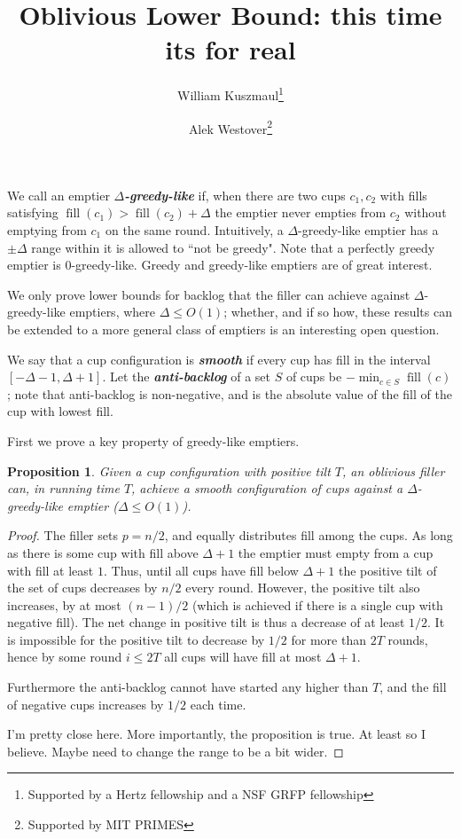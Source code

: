 \documentclass[twocolumn]{article}[10pt]
\title{Oblivious Lower Bound: this time its for real}
\date{\vspace{-5ex}}
\author[1]{\small William Kuszmaul\thanks{Supported by a Hertz fellowship and a NSF GRFP fellowship}}
\author[2]{\small Alek Westover\thanks{Supported by MIT PRIMES}}
\affil[ ]{\footnotesize MIT\textsuperscript{1}, MIT PRIMES\textsuperscript{2}}
\affil[ ]{\textit{kuszmaul@mit.edu, alek.westover@gmail.com}}
\newcommand{\defn}[1]{{\textit{\textbf{\boldmath #1}}}\xspace}
\DeclareMathOperator{\fil}{\text{fill}}
\newtheorem{proposition}{Proposition}
\begin{document}
\maketitle

We call an emptier $\Delta$\defn{-greedy-like} if, when there are two cups $c_1, c_2$ with
fills satisfying $\fil(c_1) > \fil(c_2) + \Delta$ the emptier never
empties from $c_2$ without emptying from $c_1$ on the same round. 
Intuitively, a $\Delta$-greedy-like emptier has a $\pm \Delta$ range within it is
allowed to ``not be greedy". Note that a perfectly greedy emptier is $0$-greedy-like.
Greedy and greedy-like emptiers are of great interest.

We only prove lower bounds for backlog that the filler can achieve against
$\Delta$-greedy-like emptiers, where $\Delta \le O(1)$; whether, and if so how,
these results can be extended to a more general class of emptiers is an
interesting open question. 

We say that a cup configuration is \defn{smooth} if every cup has fill in the
interval $[-\Delta -1, \Delta +1]$. 
Let the \defn{anti-backlog} of a set $S$ of cups be $-\min_{c\in S} \fil(c)$;
note that anti-backlog is non-negative, and is the absolute value of the fill
of the cup with lowest fill. 

First we prove a key property of greedy-like emptiers.
\begin{proposition}
  Given a cup configuration with positive tilt $T$, an oblivious filler can, in
  running time $T$, achieve a smooth configuration of cups against a
  $\Delta$-greedy-like emptier ($\Delta \le O(1)$).
\end{proposition}
\begin{proof}
  The filler sets $p=n/2$, and equally distributes fill among the cups.
  As long as there is some cup with fill above $\Delta+1$ the emptier must
  empty from a cup with fill at least $1$. Thus, until all cups have fill below
  $\Delta+1$ the positive tilt of the set of cups decreases by $n/2$ every round.
  However, the positive tilt also increases, by at most $(n-1)/2$ (which is
  achieved if there is a single cup with negative fill). The net change in
  positive tilt is thus a decrease of at least $1/2$.
  It is impossible for the positive tilt to decrease by $1/2$ for more than
  $2T$ rounds, hence by some round $i \le 2T$ all cups will have fill at most
  $\Delta+1$.

  Furthermore the anti-backlog cannot have started any higher than $T$, and the
  fill of negative cups increases by $1/2$ each time.

  {\color{red}I'm pretty close here. More importantly, the proposition is true.
  At least so I believe. Maybe need to change the range to be a bit wider.}

\end{proof}
\end{document}
